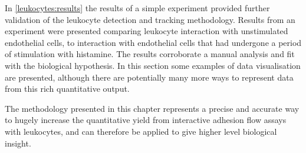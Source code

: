 In \autoref{leukocytes:results} the results of a simple experiment provided further validation of the leukocyte detection and tracking methodology. Results from an experiment were presented comparing leukocyte interaction with unstimulated endothelial cells, to interaction with endothelial cells that had undergone a period of stimulation with histamine. The results corroborate a manual analysis and fit with the biological hypothesis. In this section some examples of data visualisation are presented, although there are potentially many more ways to represent data from this rich quantitative output.

The methodology presented in this chapter represents a precise and accurate way to hugely increase the quantitative yield from interactive adhesion flow assays with leukocytes, and can therefore be applied to give higher level biological insight.
